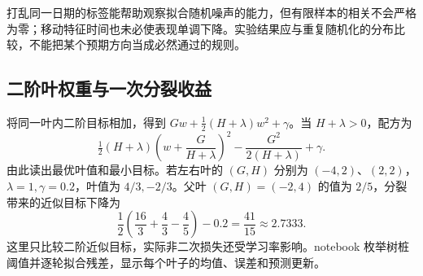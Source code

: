 打乱同一日期的标签能帮助观察拟合随机噪声的能力，但有限样本的相关不会严格为零；移动特征时间也未必使表现单调下降。实验结果应与重复随机化的分布比较，不能把某个预期方向当成必然通过的规则。

\subsection{二阶叶权重与一次分裂收益}

将同一叶内二阶目标相加，得到 $G w+\tfrac12(H+\lambda)w^2+\gamma$。当 $H+\lambda>0$，配方为
\[
 \tfrac12(H+\lambda)\left(w+\frac G{H+\lambda}\right)^2
 -\frac{G^2}{2(H+\lambda)}+\gamma.
\]
由此读出最优叶值和最小目标。若左右叶的 $(G,H)$ 分别为 $(-4,2)$、$(2,2)$，$\lambda=1,\gamma=0.2$，叶值为 $4/3,-2/3$。父叶 $(G,H)=(-2,4)$ 的值为 $2/5$，分裂带来的近似目标下降为
\[
 \frac12\left(\frac{16}{3}+\frac4{3}-\frac4{5}\right)-0.2
 =\frac{41}{15}\approx2.7333.
\]
这里只比较二阶近似目标，实际非二次损失还受学习率影响。notebook 枚举树桩阈值并逐轮拟合残差，显示每个叶子的均值、误差和预测更新。


